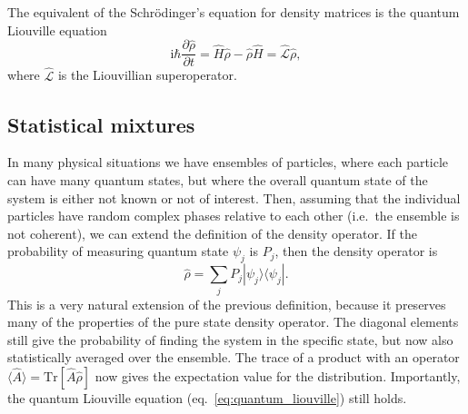 The equivalent of the Schr\"odinger's equation for density matrices is the quantum Liouville equation
\begin{equation}
	\mathrm{i}\hbar\frac{\partial \hat{\rho}}{\partial t} = \hat{H}\hat{\rho} - \hat{\rho}\hat{H} = \mathcal{\hat{L}}\hat{\rho},
	\label{eq:quantum_liouville}
\end{equation}
where $\mathcal{\hat{L}}$ is the Liouvillian superoperator.
\subsection{Statistical mixtures}
In many physical situations we have ensembles of particles, where each particle can have many quantum states, but where the overall quantum state of the system is either not known or not of interest. Then, assuming that the individual particles have random complex phases relative to each other (i.e.~the ensemble is not coherent), we can extend the definition of the density operator. If the probability of measuring quantum state $\psi_j$ is $P_j$, then the density operator is
\begin{equation}
	\hat{\rho} = \sum_j P_j |\psi_j\rangle\langle\psi_j|.
\end{equation}
This is a very natural extension of the previous definition, because it preserves many of the properties of the pure state density operator. The diagonal elements still give the probability of finding the system in the specific state, but now also statistically averaged over the ensemble. The trace of a product with an operator $\langle \hat{A} \rangle = \mathrm{Tr}[\hat{A}\hat{\rho}]$ now gives the expectation value for the distribution. Importantly, the quantum Liouville equation (eq.~\ref{eq:quantum_liouville}) still holds.
